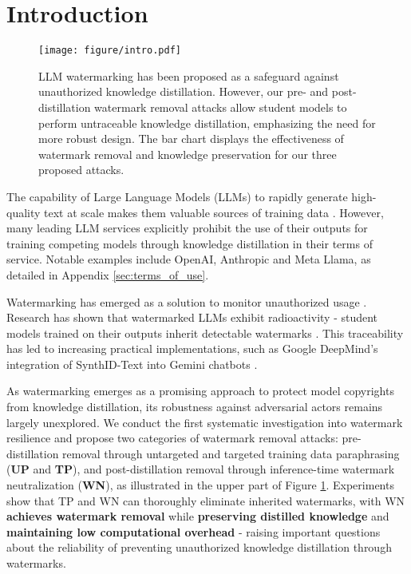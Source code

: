 \section{Introduction}
\label{sec:intro}
\begin{figure}[h!]
    \centering
    \texttt{[image: figure/intro.pdf]}
    \caption{LLM watermarking has been proposed as a safeguard against unauthorized knowledge distillation. However, our pre- and post-distillation watermark removal attacks allow student models to perform untraceable knowledge distillation, emphasizing the need for more robust design. The bar chart displays the effectiveness of watermark removal and knowledge preservation for our three proposed attacks.}
    \label{fig:intro}
    \vspace{-20pt}
\end{figure}

The capability of Large Language Models (LLMs) to rapidly generate high-quality text at scale makes them valuable sources of training data \cite{zoph2022emergent}. However, many leading LLM services explicitly prohibit the use of their outputs for training competing models through knowledge distillation in their terms of service. Notable examples include OpenAI, Anthropic and Meta Llama, as detailed in Appendix \ref{sec:terms_of_use}. 

Watermarking has emerged as a solution to monitor unauthorized usage \cite{DBLP:conf/icml/KirchenbauerGWK23, zhao2023provable, liu2024a, zhao2023protecting}. Research has shown that watermarked LLMs exhibit radioactivity - student models trained on their outputs inherit detectable watermarks \cite{sander2024watermarking,gu2024learnability}. This traceability has led to increasing practical implementations, such as Google DeepMind's integration of SynthID-Text \cite{Dathathri2024} into Gemini chatbots \cite{team2023gemini}.

As watermarking emerges as a promising approach to protect model copyrights from knowledge distillation, its robustness against adversarial actors remains largely unexplored. We conduct the first systematic investigation into watermark resilience and propose two categories of watermark removal attacks: pre-distillation removal through untargeted and targeted training data paraphrasing (\textbf{UP} and \textbf{TP}), and post-distillation removal through inference-time watermark neutralization (\textbf{WN}), as illustrated in the upper part of Figure \ref{fig:intro}. Experiments show that TP and WN can thoroughly eliminate inherited watermarks, with WN \textbf{achieves watermark removal} while \textbf{preserving distilled knowledge} and \textbf{maintaining low computational overhead} - raising important questions about the reliability of preventing unauthorized knowledge distillation through watermarks.

